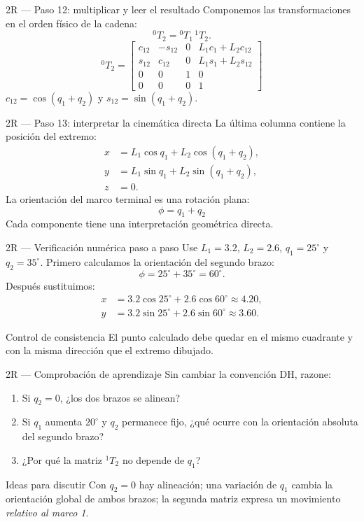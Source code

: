 \documentclass[aspectratio=169,11pt]{beamer}
\begin{document}
\begin{frame}[t]{2R — Paso 12: multiplicar y leer el resultado}
 \small
 Componemos las transformaciones en el orden físico de la cadena:
 \[
 {}^0T_2={}^0T_1\,{}^1T_2.
 \]
 \pause
 \[
 \boxed{{}^0T_2=
 \begin{bmatrix}
 c_{12}&-s_{12}&0&L_1c_1+L_2c_{12}\\
 s_{12}&c_{12}&0&L_1s_1+L_2s_{12}\\
 0&0&1&0\\0&0&0&1
 \end{bmatrix}}
 \]
 \small $c_{12}=\cos(q_1+q_2)$ y $s_{12}=\sin(q_1+q_2)$.
\end{frame}

\begin{frame}[t]{2R — Paso 13: interpretar la cinemática directa}
 \small
 La última columna contiene la posición del extremo:
 \[
 \boxed{\begin{aligned}
 x&=L_1\cos q_1+L_2\cos(q_1+q_2),\\
 y&=L_1\sin q_1+L_2\sin(q_1+q_2),\\
 z&=0.
 \end{aligned}}
 \]
 \pause
 La orientación del marco terminal es una rotación plana:
 \[
 \boxed{\phi=q_1+q_2}
 \]
 \small Cada componente tiene una interpretación geométrica directa.
\end{frame}

\begin{frame}[t]{2R — Verificación numérica paso a paso}
 \small
 Use $L_1=3.2$, $L_2=2.6$, $q_1=25^\circ$ y $q_2=35^\circ$.
 Primero calculamos la orientación del segundo brazo:
 \[\phi=25^\circ+35^\circ=60^\circ.\]
 \pause
 Después sustituimos:
 \[
 \begin{aligned}
 x&=3.2\cos25^\circ+2.6\cos60^\circ\approx4.20,\\
 y&=3.2\sin25^\circ+2.6\sin60^\circ\approx3.60.
 \end{aligned}
 \]
 \begin{block}{Control de consistencia}
 El punto calculado debe quedar en el mismo cuadrante
 y con la misma dirección que el extremo dibujado.
 \end{block}
\end{frame}

\begin{frame}[t]{2R — Comprobación de aprendizaje}
 \small
 Sin cambiar la convención DH, razone:
 \begin{enumerate}
 \item Si $q_2=0$, ¿los dos brazos se alinean?
 \item Si $q_1$ aumenta $20^\circ$ y $q_2$ permanece fijo,
       ¿qué ocurre con la orientación absoluta del segundo brazo?
 \item ¿Por qué la matriz ${}^1T_2$ no depende de $q_1$?
 \end{enumerate}
 \pause
 \begin{block}{Ideas para discutir}
 Con $q_2=0$ hay alineación; una variación de $q_1$
 cambia la orientación global de ambos brazos; la segunda matriz
 expresa un movimiento \emph{relativo al marco 1}.
 \end{block}
\end{frame}
\end{document}
